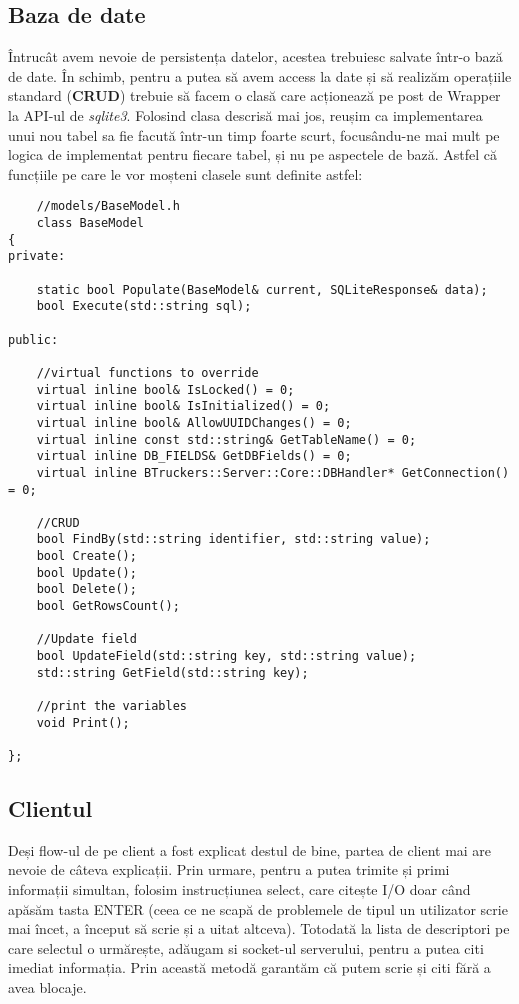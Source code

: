 \documentclass{article}
\begin{document}
\subsection{Baza de date}
Întrucât avem nevoie de persistența datelor, acestea trebuiesc salvate într-o bază de date. În schimb, pentru a putea să avem access la date și să realizăm operațiile standard (\textbf{CRUD}) trebuie să facem o clasă care acționează pe post de Wrapper la API-ul de \textit{sqlite3}. Folosind clasa descrisă mai jos, reușim ca implementarea unui nou tabel sa fie facută într-un timp foarte scurt, focusându-ne mai mult pe logica de implementat pentru fiecare tabel, și nu pe aspectele de bază. Astfel că funcțiile pe care le vor moșteni clasele sunt definite astfel:

\begin{lstlisting}
    //models/BaseModel.h
    class BaseModel
{
private:
    
    static bool Populate(BaseModel& current, SQLiteResponse& data);
    bool Execute(std::string sql);

public:

    //virtual functions to override
    virtual inline bool& IsLocked() = 0;
    virtual inline bool& IsInitialized() = 0;
    virtual inline bool& AllowUUIDChanges() = 0;
    virtual inline const std::string& GetTableName() = 0;
    virtual inline DB_FIELDS& GetDBFields() = 0;
    virtual inline BTruckers::Server::Core::DBHandler* GetConnection() = 0;

    //CRUD
    bool FindBy(std::string identifier, std::string value);
    bool Create();
    bool Update();
    bool Delete();
    bool GetRowsCount();

    //Update field
    bool UpdateField(std::string key, std::string value);
    std::string GetField(std::string key);

    //print the variables
    void Print();

};
\end{lstlisting}

\subsection{Clientul}
Deși flow-ul de pe client a fost explicat destul de bine, partea de client mai are nevoie de câteva explicații. Prin urmare, pentru a putea trimite și primi informații simultan, folosim instrucțiunea select, care citește I/O doar când apăsăm tasta ENTER (ceea ce ne scapă de problemele de tipul un utilizator scrie mai încet, a început să scrie și a uitat altceva). Totodată la lista de descriptori pe care selectul o urmărește, adăugam si socket-ul serverului, pentru a putea citi imediat informația. Prin această metodă garantăm că putem scrie și citi fără a avea blocaje.
\end{document}
